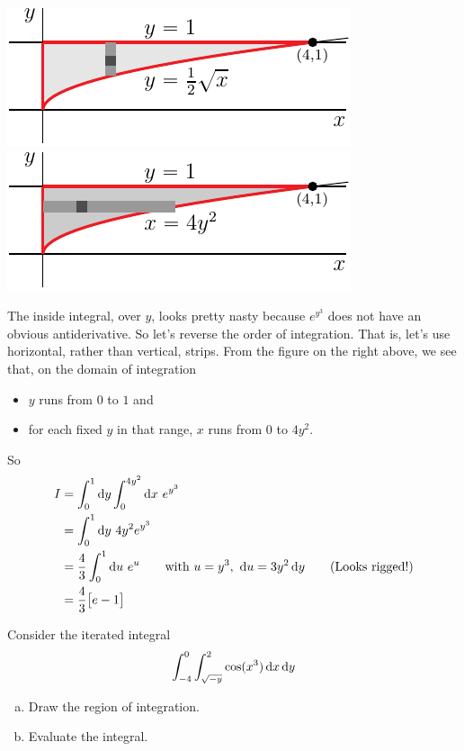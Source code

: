 \begin{solution}
\begin{center}
     \includegraphics{fig/OE10D_5bv.pdf}\qquad
     \includegraphics{fig/OE10D_5bh.pdf}\qquad
\end{center}

The inside integral, over $y$, looks pretty nasty because $e^{y^3}$
does not have an obvious antiderivative. So let's reverse the order
of integration. That is, let's use horizontal, rather than vertical,
strips. From the figure on the right above, we see that, on the
domain of integration
\begin{itemize}
\item
$y$ runs from $0$ to $1$ and
\item 
for each fixed $y$ in that range, $x$ runs from $0$ to $4y^2$.
\end{itemize}
So 
\begin{align*}
I &= \int_0^1\mathrm{d}y\int_0^{4y^2}\mathrm{d}x\ e^{y^3} \\
  &= \int_0^1\mathrm{d}y\ 4y^2 e^{y^3} \\
  &= \frac{4}{3}\int_0^1\mathrm{d}u\ e^u \qquad\text{with }
                 u=y^3,\ \mathrm{d}u=3y^2\,\mathrm{d}y\qquad
                 \text{(Looks rigged!)}\\
  &=\frac{4}{3}\big[e-1\big]
\end{align*}
\end{solution}

\begin{question}[M200 2011D] %
Consider the iterated integral
\begin{equation*}
\int_{-4}^0\int_{\sqrt{-y}}^2 \cos(x^3)\,\mathrm{d}x\,\mathrm{d}y
\end{equation*}
\begin{enumerate}[(a)]
\item
Draw the region of integration.
\item
Evaluate the integral.
\end{enumerate}
\end{question}

